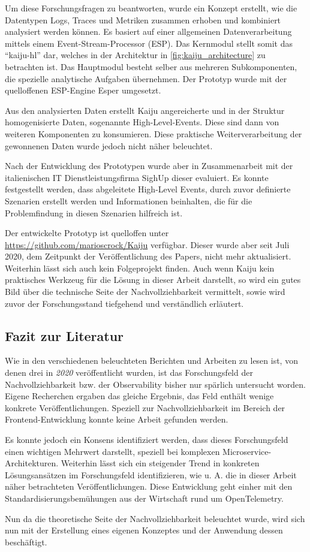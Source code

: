 Um diese Forschungsfragen zu beantworten, wurde ein Konzept erstellt, wie die Datentypen Logs, Traces und Metriken zusammen erhoben und kombiniert analysiert werden können. Es basiert auf einer allgemeinen Datenverarbeitung mittels einem Event-Stream-Processor (ESP). Das Kernmodul stellt somit das \enquote{kaiju-hl} dar, welches in der Architektur in \autoref{fig:kaiju_architecture} zu betrachten ist. Das Hauptmodul besteht selber aus mehreren Subkomponenten, die spezielle analytische Aufgaben übernehmen. Der Prototyp wurde mit der quelloffenen ESP-Engine Esper \cite{Esper} umgesetzt.


Aus den analysierten Daten erstellt Kaiju angereicherte und in der Struktur homogenisierte Daten, sogenannte High-Level-Events. Diese sind dann von weiteren Komponenten zu konsumieren. Diese praktische Weiterverarbeitung der gewonnenen Daten wurde jedoch nicht näher beleuchtet.

Nach der Entwicklung des Prototypen wurde aber in Zusammenarbeit mit der italienischen IT Dienstleistungsfirma SighUp dieser evaluiert. Es konnte festgestellt werden, dass abgeleitete High-Level Events, durch zuvor definierte Szenarien erstellt werden und Informationen beinhalten, die für die Problemfindung in diesen Szenarien hilfreich ist.

Der entwickelte Prototyp ist quelloffen unter \url{https://github.com/marioscrock/Kaiju} verfügbar. Dieser wurde aber seit Juli 2020, dem Zeitpunkt der Veröffentlichung des Papers, nicht mehr aktualisiert. Weiterhin lässt sich auch kein Folgeprojekt finden. Auch wenn Kaiju kein praktisches Werkzeug für die Lösung in dieser Arbeit darstellt, so wird ein gutes Bild über die technische Seite der Nachvollziehbarkeit vermittelt, sowie wird zuvor der Forschungsstand tiefgehend und verständlich erläutert.

\subsection{Fazit zur Literatur}

Wie in den verschiedenen beleuchteten Berichten und Arbeiten zu lesen ist, von denen drei in \textit{2020} veröffentlicht wurden, ist das Forschungsfeld der Nachvollziehbarkeit bzw. der Observability bisher nur spärlich untersucht worden. Eigene Recherchen ergaben das gleiche Ergebnis, das Feld enthält wenige konkrete Veröffentlichungen. Speziell zur Nachvollziehbarkeit im Bereich der Frontend-Entwicklung konnte keine Arbeit gefunden werden.

Es konnte jedoch ein Konsens identifiziert werden, dass dieses Forschungsfeld einen wichtigen Mehrwert darstellt, speziell bei komplexen Microservice-Architekturen. Weiterhin lässt sich ein steigender Trend in konkreten Lösungsansätzen im Forschungsfeld identifizieren, wie u. A. die in dieser Arbeit näher betrachteten Veröffentlichungen. Diese Entwicklung geht einher mit den Standardisierungsbemühungen aus der Wirtschaft rund um OpenTelemetry.

Nun da die theoretische Seite der Nachvollziehbarkeit beleuchtet wurde, wird sich nun mit der Erstellung eines eigenen Konzeptes und der Anwendung dessen beschäftigt.